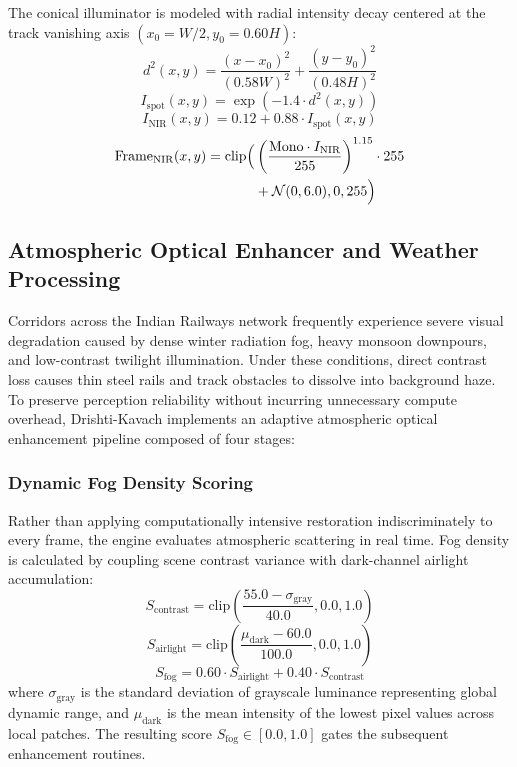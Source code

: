 \documentclass[conference]{IEEEtran}
\begin{document}
The conical illuminator is modeled with radial intensity decay centered at the track vanishing axis $(x_0 = W/2, y_0 = 0.60 H)$:
\begin{equation}
d^2(x,y) = \frac{(x - x_0)^2}{(0.58 W)^2} + \frac{(y - y_0)^2}{(0.48 H)^2}
\end{equation}
\begin{equation}
I_{\text{spot}}(x,y) = \exp\left(-1.4 \cdot d^2(x,y)\right)
\end{equation}
\begin{equation}
I_{\text{NIR}}(x,y) = 0.12 + 0.88 \cdot I_{\text{spot}}(x,y)
\end{equation}
\begin{align}
\text{Frame}_{\text{NIR}}(x,y) = \text{clip}\Big( &\left(\frac{\text{Mono} \cdot I_{\text{NIR}}}{255}\right)^{1.15} \cdot 255 \notag \\
&+ \mathcal{N}(0, 6.0), 0, 255 \Big)
\end{align}

\subsection{Atmospheric Optical Enhancer and Weather Processing}
Corridors across the Indian Railways network frequently experience severe visual degradation caused by dense winter radiation fog, heavy monsoon downpours, and low-contrast twilight illumination. Under these conditions, direct contrast loss causes thin steel rails and track obstacles to dissolve into background haze. To preserve perception reliability without incurring unnecessary compute overhead, Drishti-Kavach implements an adaptive atmospheric optical enhancement pipeline composed of four stages:

\subsubsection{Dynamic Fog Density Scoring}
Rather than applying computationally intensive restoration indiscriminately to every frame, the engine evaluates atmospheric scattering in real time. Fog density is calculated by coupling scene contrast variance with dark-channel airlight accumulation:
\begin{equation}
S_{\text{contrast}} = \text{clip}\left(\frac{55.0 - \sigma_{\text{gray}}}{40.0}, 0.0, 1.0\right)
\end{equation}
\begin{equation}
S_{\text{airlight}} = \text{clip}\left(\frac{\mu_{\text{dark}} - 60.0}{100.0}, 0.0, 1.0\right)
\end{equation}
\begin{equation}
S_{\text{fog}} = 0.60 \cdot S_{\text{airlight}} + 0.40 \cdot S_{\text{contrast}}
\end{equation}
where $\sigma_{\text{gray}}$ is the standard deviation of grayscale luminance representing global dynamic range, and $\mu_{\text{dark}}$ is the mean intensity of the lowest pixel values across local patches. The resulting score $S_{\text{fog}} \in [0.0, 1.0]$ gates the subsequent enhancement routines.
\end{document}
